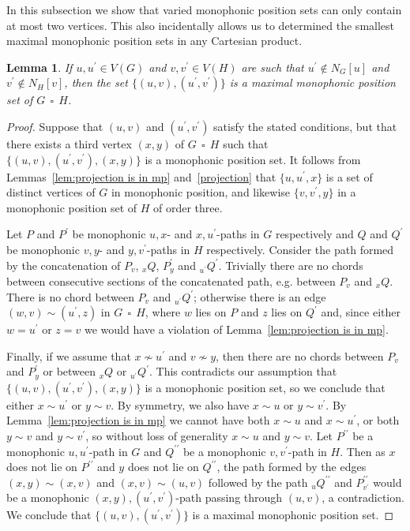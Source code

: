 \documentclass[12pt]{article}
\newtheorem{lemma}[theorem]{Lemma}
\DeclareMathOperator{\cp}{\,\square\,}
\begin{document}
In this subsection we show that varied monophonic position sets can only contain at most two vertices. This also incidentally allows us to determined the smallest maximal monophonic position sets in any Cartesian product.

\begin{lemma}\label{lemma:interval} 
If $u, u^{\prime} \in V(G)$ and $v, v^{\prime } \in V(H)$ are such that $u^{\prime} \not \in N_G[u]$ and $v^{\prime} \not \in N_H[v]$, then the set $\{(u,v),(u^{\prime},v^{\prime})\}$ is a maximal monophonic position set of $G\cp H$.
\end{lemma}
\begin{proof} 
Suppose that $(u,v)$ and $(u^{\prime},v^{\prime})$ satisfy the stated conditions, but that there exists a third vertex $(x,y)$ of $G \cp H$ such that $\{(u,v),(u^{\prime},v^{\prime}),(x,y)\}$ is a monophonic position set. It follows from Lemmas~\ref{lem:projection is in mp} and~\ref{projection} that $\{ u,u^{\prime },x\} $ is a set of distinct vertices of $G$ in monophonic position, and likewise $\{ v,v^{\prime },y\} $ in a monophonic position set of $H$ of order three.

Let $P$ and $P^{\prime }$ be monophonic $u,x$- and $x,u^{\prime }$-paths in $G$ respectively and $Q$ and $Q^{\prime }$ be monophonic $v,y$- and $y,v^{\prime }$-paths in $H$ respectively. Consider the path formed by the concatenation of $P_v$, $_{x}Q$, $P^{\prime }_y$ and $_{u^{\prime }}Q^{\prime }$. Trivially there are no chords between consecutive sections of the concatenated path, e.g. between $P_v$ and $_{x}Q$. There is no chord between $P_v$ and $_{u^{\prime }}Q^{\prime}$; otherwise there is an edge $(w,v) \sim (u^{\prime },z)$ in $G \cp H$, where $w$ lies on $P$ and $z$ lies on $Q^{\prime}$ and, since either $w = u^{\prime}$ or $z = v$ we would have a violation of Lemma~\ref{lem:projection is in mp}. 

Finally, if we assume that $x \not \sim u^{\prime }$ and $v \not \sim y$, then there are no chords between $P_v$ and $P^{\prime}_y$ or between $_{x}Q$ or $_{u^{\prime }}Q^{\prime}$. This contradicts our assumption that $\{(u,v),(u^{\prime},v^{\prime}),(x,y)\}$ is a monophonic position set, so we conclude that either $x \sim u^{\prime }$ or $y \sim v$. By symmetry, we also have $x \sim u$ or $y \sim v^{\prime }$. By Lemma~\ref{lem:projection is in mp} we cannot have both $x \sim u$ and $x \sim u^{\prime }$, or both $y \sim v$ and $y \sim v^{\prime }$, so without loss of generality $x \sim u$ and $y \sim v$. Let $P^{\prime \prime }$ be a monophonic $u,u^{\prime }$-path in $G$ and $Q^{\prime \prime }$ be a monophonic $v,v^{\prime }$-path in $H$. Then as $x$ does not lie on $P^{\prime \prime }$ and $y$ does not lie on $Q^{\prime \prime }$, the path formed by the edges $(x,y) \sim (x,v)$ and $(x,v) \sim (u,v)$ followed by the path $_{u}Q^{\prime \prime}$ and $P^{\prime \prime} _{v^{\prime}}$ would be a monophonic $(x,y),(u^{\prime },v^{\prime })$-path passing through $(u,v)$, a contradiction. We conclude that $\{(u,v),(u^{\prime},v^{\prime})\} $ is a maximal monophonic position set. 
\end{proof}
\end{document}
